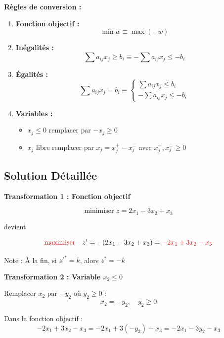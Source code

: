 \documentclass[12pt,a4paper]{article}
\begin{document}
\begin{methode}
\textbf{Règles de conversion :}

\begin{enumerate}
    \item \textcolor{titrebleu}{\textbf{Fonction objectif :}}
    $$\min w \equiv \max (-w)$$
    
    \item \textcolor{defvert}{\textbf{Inégalités :}}
    $$\sum a_{ij}x_j \geq b_i \equiv -\sum a_{ij}x_j \leq -b_i$$
    
    \item \textcolor{algoviolet}{\textbf{Égalités :}}
    $$\sum a_{ij}x_j = b_i \equiv \begin{cases}
    \sum a_{ij}x_j \leq b_i\\
    -\sum a_{ij}x_j \leq -b_i
    \end{cases}$$
    
    \item \textcolor{exempleorange}{\textbf{Variables :}}
    \begin{itemize}
        \item $x_j \leq 0$ remplacer par $-x_j \geq 0$
        \item $x_j$ libre remplacer par $x_j = x_j^+ - x_j^-$ avec $x_j^+, x_j^- \geq 0$
    \end{itemize}
\end{enumerate}
\end{methode}

\newpage
\subsection{Solution Détaillée}

\begin{solution}
\textbf{Transformation 1 : Fonction objectif}

$$\text{minimiser } z = 2x_1 - 3x_2 + x_3$$

devient

$$\text{\textcolor{importantrouge}{maximiser}} \quad z' = -(2x_1 - 3x_2 + x_3) = \textcolor{importantrouge}{-2x_1 + 3x_2 - x_3}$$

Note : À la fin, si $z'^* = k$, alors $z^* = -k$
\end{solution}

\begin{solution}
\textbf{Transformation 2 : Variable $x_2 \leq 0$}

Remplacer $x_2$ par $-y_2$ où $y_2 \geq 0$ :
$$x_2 = -y_2, \quad y_2 \geq 0$$

Dans la fonction objectif :
$$-2x_1 + 3x_2 - x_3 = -2x_1 + 3(-y_2) - x_3 = -2x_1 - 3y_2 - x_3$$
\end{solution}
\end{document}
